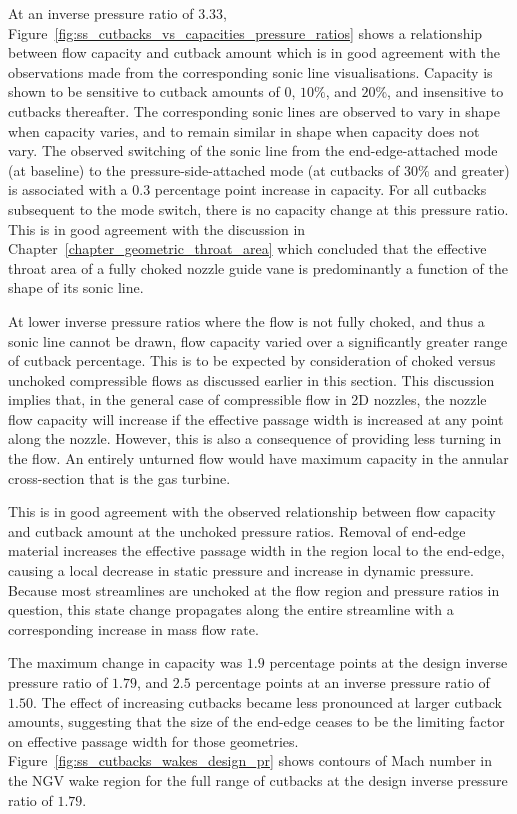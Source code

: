 \documentclass[a4paper, 11pt, oneside]{report}
\begin{document}
At an inverse pressure ratio of $3.33$, Figure~\ref{fig:ss_cutbacks_vs_capacities_pressure_ratios} shows a relationship between flow capacity and cutback amount which is in good agreement with the observations made from the corresponding sonic line visualisations. Capacity is shown to be sensitive to cutback amounts of $0$, $10\%$, and $20\%$, and insensitive to cutbacks thereafter. The corresponding sonic lines are observed to vary in shape when capacity varies, and to remain similar in shape when capacity does not vary. The observed switching of the sonic line from the end-edge-attached mode (at baseline) to the pressure-side-attached mode (at cutbacks of $30\%$ and greater) is associated with a $0.3$ percentage point increase in capacity. For all cutbacks subsequent to the mode switch, there is no capacity change at this pressure ratio. This is in good agreement with the discussion in Chapter~\ref{chapter_geometric_throat_area} which concluded that the effective throat area of a fully choked nozzle guide vane is predominantly a function of the shape of its sonic line.

At lower inverse pressure ratios where the flow is not fully choked, and thus a sonic line cannot be drawn, flow capacity varied over a significantly greater range of cutback percentage. This is to be expected by consideration of choked versus unchoked compressible flows as discussed earlier in this section. This discussion implies that, in the general case of compressible flow in 2D nozzles, the nozzle flow capacity will increase if the effective passage width is increased at any point along the nozzle. However, this is also a consequence of providing less turning in the flow. An entirely unturned flow would have maximum capacity in the annular cross-section that is the gas turbine. 

This is in good agreement with the observed relationship between flow capacity and cutback amount at the unchoked pressure ratios. Removal of end-edge material increases the effective passage width in the region local to the end-edge, causing a local decrease in static pressure and increase in dynamic pressure. Because most streamlines are unchoked at the flow region and pressure ratios in question, this state change propagates along the entire streamline with a corresponding increase in mass flow rate.

The maximum change in capacity was $1.9$ percentage points at the design inverse pressure ratio of $1.79$, and $2.5$ percentage points at an inverse pressure ratio of $1.50$. The effect of increasing cutbacks became less pronounced at larger cutback amounts, suggesting that the size of the end-edge ceases to be the limiting factor on effective passage width for those geometries. Figure~\ref{fig:ss_cutbacks_wakes_design_pr} shows contours of Mach number in the NGV wake region for the full range of cutbacks at the design inverse pressure ratio of $1.79$. 
\end{document}

